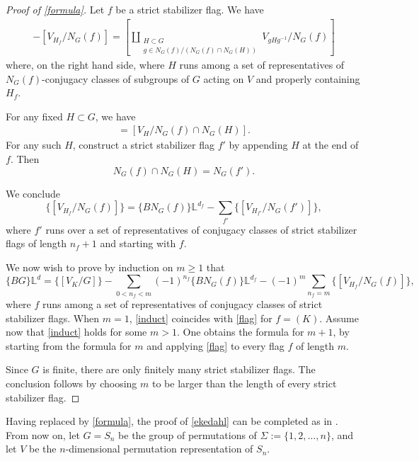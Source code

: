 \documentclass[12 pt]{amsart}
\theoremstyle{plain}
\theoremstyle{definition}
\theoremstyle{remark}
\numberwithin{equation}{section}
\renewcommand{\L}{\mathbb L}
\begin{document}
\begin{proof}[Proof of \autoref{formula}]
	Let $f$ be a strict stabilizer flag. 
	We have
	\begin{align*}
		[V^{H_f}/N_G(f)] - [V_{H_f}/N_G(f)] =
[\coprod_{\substack{H \subset G \\ g\in N_G(f)/(N_G(f)\cap
	N_G(H))}} V_{gHg^{-1}}/N_G(f)]
	\end{align*}
	where, on the right hand side, 
	where $H$ runs among a set of representatives of $N_G(f)$-conjugacy classes of
	subgroups of $G$ acting on $V$ and properly containing $H_f$. 

	For any fixed $H \subset G$, we have
	\begin{align*}
		[\coprod_{g\in N_G(f)/(N_G(f)\cap
	N_G(H))}V_{gHg^{-1}}/N_G(f)] = 
	[V_{H}/N_G(f)\cap N_G(H)].
	\end{align*}
	For any
	such $H$, construct a strict stabilizer flag $f'$ by appending $H$ at
	the end of $f$. Then \[N_G(f)\cap N_G(H)=N_G(f').\]

	We conclude
	\begin{equation}\label{flag}\{[V_{H_f}/N_G(f)]\}=\{BN_G(f)\}\L^{d_f}-\sum_{f'}\{[V_{H_{f'}}/N_G(f')]\},\end{equation} 
	where $f'$ runs over a set of representatives of conjugacy classes of strict stabilizer flags of length $n_f+1$ and starting with $f$.
	
	We now wish to prove by induction on $m\geq 1$ that 
	\begin{equation}\label{induct}
	\{BG\}\L^d=\{[V_K/G]\}-\sum_{0< n_f< m}(-1)^{n_f}\{BN_G(f)\}\L^{d_f}-(-1)^m\sum_{n_f=m}\{[V_{H_f}/N_G(f)]\},
	\end{equation}
	where $f$ runs among a set of representatives of conjugacy classes of strict stabilizer flags.
	When $m=1$, \eqref{induct} coincides with \eqref{flag} for
	$f=(K)$. Assume now that \eqref{induct} holds for some $m>1$. One
	obtains the formula for $m+1$, by starting from the formula for $m$ and
	applying \eqref{flag} to every flag $f$ of length $m$. 
	
	Since $G$ is finite, there are only finitely many strict stabilizer flags. The conclusion follows by choosing $m$ to be larger than the length of every strict stabilizer flag.
\end{proof}
	
	Having replaced \cite[Thm.\ 3.4]{ekedahlGeometricInvariantFinite2009}
	by \autoref{formula}, the proof of \autoref{ekedahl}	can be completed
	as in \cite{ekedahlGeometricInvariantFinite2009}. From now on, let
	$G=S_n$ be the group of permutations of $\Sigma:=\{1,2,\dots,n\}$, and
	let $V$ be the $n$-dimensional permutation representation of $S_n$.
	
\end{document}
